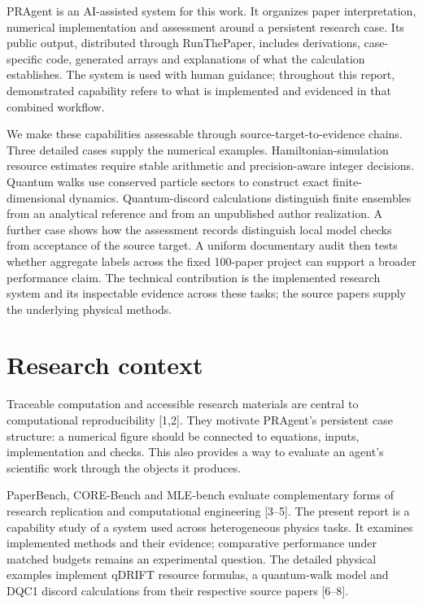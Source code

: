\documentclass[10pt,a4paper]{article}
\begin{document}
PRAgent is an AI-assisted system for this work. It organizes paper
interpretation, numerical implementation and assessment around a
persistent research case. Its public output, distributed through
RunThePaper, includes derivations, case-specific code, generated arrays
and explanations of what the calculation establishes. The system is used
with human guidance; throughout this report, demonstrated capability
refers to what is implemented and evidenced in that combined workflow.

We make these capabilities assessable through source-target-to-evidence
chains. Three detailed cases supply the numerical examples.
Hamiltonian-simulation resource estimates require stable arithmetic and
precision-aware integer decisions. Quantum walks use conserved particle
sectors to construct exact finite-dimensional dynamics. Quantum-discord
calculations distinguish finite ensembles from an analytical reference
and from an unpublished author realization. A further case shows how the
assessment records distinguish local model checks from acceptance of the
source target. A uniform documentary audit then tests whether aggregate
labels across the fixed 100-paper project can support a broader
performance claim. The technical contribution is the implemented
research system and its inspectable evidence across these tasks; the
source papers supply the underlying physical methods.

\section{Research context}\label{research-context}

Traceable computation and accessible research materials are central to
computational reproducibility {[}1,2{]}. They motivate PRAgent's
persistent case structure: a numerical figure should be connected to
equations, inputs, implementation and checks. This also provides a way
to evaluate an agent's scientific work through the objects it produces.

PaperBench, CORE-Bench and MLE-bench evaluate complementary forms of
research replication and computational engineering {[}3--5{]}. The
present report is a capability study of a system used across
heterogeneous physics tasks. It examines implemented methods and their
evidence; comparative performance under matched budgets remains an
experimental question. The detailed physical examples implement qDRIFT
resource formulas, a quantum-walk model and DQC1 discord calculations
from their respective source papers {[}6--8{]}.
\end{document}
